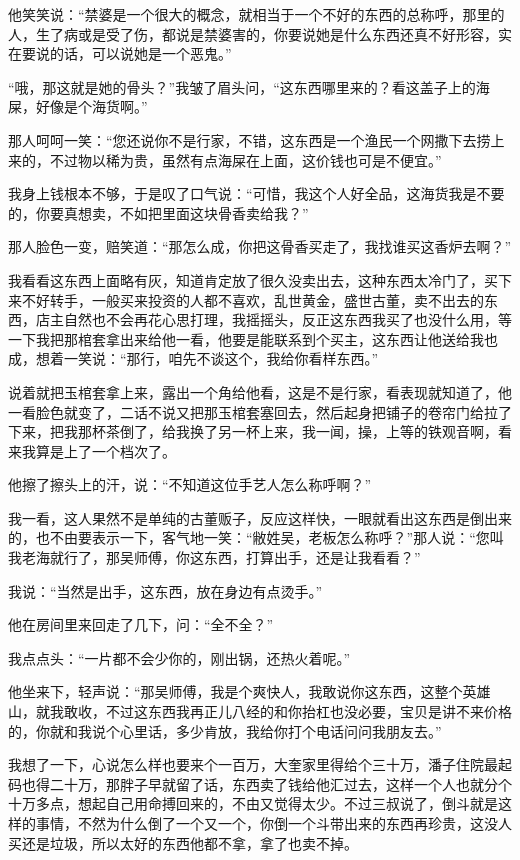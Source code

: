 他笑笑说：“禁婆是一个很大的概念，就相当于一个不好的东西的总称呼，那里的人，生了病或是受了伤，都说是禁婆害的，你要说她是什么东西还真不好形容，实在要说的话，可以说她是一个恶鬼。”

“哦，那这就是她的骨头？”我皱了眉头问，“这东西哪里来的？看这盖子上的海屎，好像是个海货啊。”

那人呵呵一笑：“您还说你不是行家，不错，这东西是一个渔民一个网撒下去捞上来的，不过物以稀为贵，虽然有点海屎在上面，这价钱也可是不便宜。”

我身上钱根本不够，于是叹了口气说：“可惜，我这个人好全品，这海货我是不要的，你要真想卖，不如把里面这块骨香卖给我？”

那人脸色一变，赔笑道：“那怎么成，你把这骨香买走了，我找谁买这香炉去啊？”

我看看这东西上面略有灰，知道肯定放了很久没卖出去，这种东西太冷门了，买下来不好转手，一般买来投资的人都不喜欢，乱世黄金，盛世古董，卖不出去的东西，店主自然也不会再花心思打理，我摇摇头，反正这东西我买了也没什么用，等一下我把那棺套拿出来给他一看，他要是能联系到个买主，这东西让他送给我也成，想着一笑说：“那行，咱先不谈这个，我给你看样东西。”

说着就把玉棺套拿上来，露出一个角给他看，这是不是行家，看表现就知道了，他一看脸色就变了，二话不说又把那玉棺套塞回去，然后起身把铺子的卷帘门给拉了下来，把我那杯茶倒了，给我换了另一杯上来，我一闻，操，上等的铁观音啊，看来我算是上了一个档次了。

他擦了擦头上的汗，说：“不知道这位手艺人怎么称呼啊？”

我一看，这人果然不是单纯的古董贩子，反应这样快，一眼就看出这东西是倒出来的，也不由要表示一下，客气地一笑：“敝姓吴，老板怎么称呼？”那人说：“您叫我老海就行了，那吴师傅，你这东西，打算出手，还是让我看看？”

我说：“当然是出手，这东西，放在身边有点烫手。”

他在房间里来回走了几下，问：“全不全？”

我点点头：“一片都不会少你的，刚出锅，还热火着呢。”

他坐来下，轻声说：“那吴师傅，我是个爽快人，我敢说你这东西，这整个英雄山，就我敢收，不过这东西我再正儿八经的和你抬杠也没必要，宝贝是讲不来价格的，你就和我说个心里话，多少肯放，我给你打个电话问问我朋友去。”

我想了一下，心说怎么样也要来个一百万，大奎家里得给个三十万，潘子住院最起码也得二十万，那胖子早就留了话，东西卖了钱给他汇过去，这样一个人也就分个十万多点，想起自己用命搏回来的，不由又觉得太少。不过三叔说了，倒斗就是这样的事情，不然为什么倒了一个又一个，你倒一个斗带出来的东西再珍贵，这没人买还是垃圾，所以太好的东西他都不拿，拿了也卖不掉。

